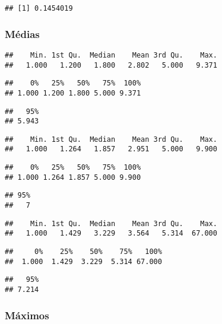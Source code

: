\documentclass[
]{article}
\begin{document}
\begin{verbatim}
## [1] 0.1454019
\end{verbatim}

\hypertarget{muxe9dias}{%
\subsubsection{Médias}\label{muxe9dias}}

\begin{verbatim}
##    Min. 1st Qu.  Median    Mean 3rd Qu.    Max. 
##   1.000   1.200   1.800   2.802   5.000   9.371
\end{verbatim}

\begin{verbatim}
##    0%   25%   50%   75%  100% 
## 1.000 1.200 1.800 5.000 9.371
\end{verbatim}

\begin{verbatim}
##   95% 
## 5.943
\end{verbatim}

\begin{verbatim}
##    Min. 1st Qu.  Median    Mean 3rd Qu.    Max. 
##   1.000   1.264   1.857   2.951   5.000   9.900
\end{verbatim}

\begin{verbatim}
##    0%   25%   50%   75%  100% 
## 1.000 1.264 1.857 5.000 9.900
\end{verbatim}

\begin{verbatim}
## 95% 
##   7
\end{verbatim}

\begin{verbatim}
##    Min. 1st Qu.  Median    Mean 3rd Qu.    Max. 
##   1.000   1.429   3.229   3.564   5.314  67.000
\end{verbatim}

\begin{verbatim}
##     0%    25%    50%    75%   100% 
##  1.000  1.429  3.229  5.314 67.000
\end{verbatim}

\begin{verbatim}
##   95% 
## 7.214
\end{verbatim}

\hypertarget{muxe1ximos}{%
\subsubsection{Máximos}\label{muxe1ximos}}
\end{document}
